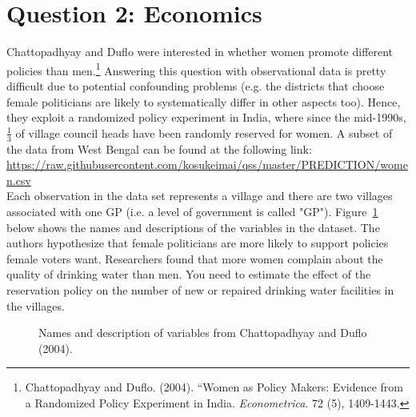 \documentclass[12pt,letterpaper]{article}
\begin{document}
\section*{Question 2: Economics}
Chattopadhyay and Duflo were interested in whether women promote different policies than men.\footnote{Chattopadhyay and Duflo. (2004). ``Women as Policy Makers: Evidence from a Randomized Policy Experiment in India. \textit{Econometrica}. 72 (5), 1409-1443.} Answering this question with observational data is pretty difficult due to potential confounding problems (e.g. the districts that choose female politicians are likely to systematically differ in other aspects too). Hence, they exploit a randomized policy experiment in India, where since the mid-1990s, $\frac{1}{3}$ of village council heads have been randomly reserved for women. A subset of the data from West Bengal can be found at the following link: \url{https://raw.githubusercontent.com/kosukeimai/qss/master/PREDICTION/women.csv}\\

\noindent Each observation in the data set represents a village and there are two villages associated with one GP (i.e. a level of government is called "GP"). Figure~\ref{fig:women_desc} below shows the names and descriptions of the variables in the dataset. The authors hypothesize that female politicians are more likely to support policies female voters want. Researchers found that more women complain about the quality of drinking water than men. You need to estimate the effect of the reservation policy on the number of new or repaired drinking water facilities in the villages.
\vspace{.5cm}
\begin{figure}[h!]
	\caption{\footnotesize{Names and description of variables from Chattopadhyay and Duflo (2004).}}
	\vspace{.5cm}
	\centering
	\label{fig:women_desc}
\end{figure}		
\end{document}
